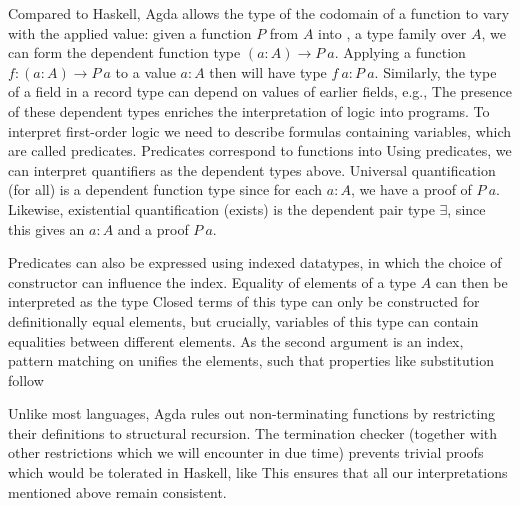 Compared to Haskell, Agda allows the type of the codomain of a function to vary with the applied value:
given a function $P$ from $A$ into , a type family over $A$, we can form the dependent function type $(a : A) \to P\ a$. Applying a function $f: (a : A) \to P\ a$ to a value $a : A$ then will have type $f\ a : P\ a$. Similarly, the type of a field in a record type can depend on values of earlier fields, e.g.,
The presence of these dependent types enriches the interpretation of logic into programs. To interpret first-order logic we need to describe formulas containing variables, which are called predicates. Predicates correspond to functions into 
Using predicates, we can interpret quantifiers as the dependent types above. Universal quantification (for all) is a dependent function type 
since for each $a : A$, we have a proof of $P\ a$. Likewise, existential quantification (exists) is the dependent pair type $\exists$, since this gives an $a : A$ and a proof $P\ a$. 

Predicates can also be expressed using indexed datatypes, in which the choice of constructor can influence the index. Equality of elements of a type $A$ can then be interpreted as the type
Closed terms of this type can only be constructed for definitionally equal elements, but crucially, variables of this type can contain equalities between different elements. As the second argument is an index, pattern matching on  unifies the elements, such that properties like substitution follow

Unlike most languages, Agda rules out non-terminating functions by restricting their definitions to structural recursion. The termination checker (together with other restrictions which we will encounter in due time) prevents trivial proofs which would be tolerated in Haskell, like
This ensures that all our interpretations mentioned above remain consistent.

\begin{comment}
With this, we can do maths. For example, we could define natural numbers as an inductive type
\[ \dots \]
and prove some properties of prime numbers. But to get the same results to binary numbers (without duplicating the proofs), we need a bit more. The usual notion of equalities of types are isomorphisms: two types $A, B$ are isomorphic if there are functions $A \to B$ and $B \to A$, which are mutually inverse 
\[ \dots \]
In ordinary Agda, we cannot directly apply these to transport along like we can for equalities, however.
\end{comment}

